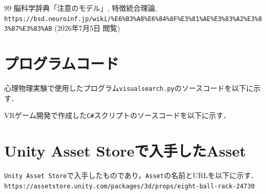\documentclass[paper=a4, fontsize=10pt]{jlreq}
\begin{document}
\begin{thebibliography}{99}
   脳科学辞典「注意のモデル」, 特徴統合理論, \texttt{https://bsd.neuroinf.jp/wiki/\%E6\%B3\%A8\%E6\%84\%8F\%E3\%81\%AE\%E3\%83\%A2\%E3\%83\%87\%E3\%83\%AB} (2026年7月5日 閲覧)
\end{thebibliography}

\appendix
\section{プログラムコード}
心理物理実験で使用したプログラム\texttt{visualsearch.py}のソースコードを以下に示す．



\vspace{4em}

VRゲーム開発で作成した\texttt{C\#}スクリプトのソースコードを以下に示す．



\vspace{2em}



\vspace{2em}



\section{Unity Asset Storeで入手したAsset}
\texttt{Unity Asset Store}で入手したものであり，\texttt{Asset}の名前とURLを以下に示す．
\label{sec:asset}
\texttt{https://assetstore.unity.com/packages/3d/props/eight-ball-rack-24730}
\end{document}
